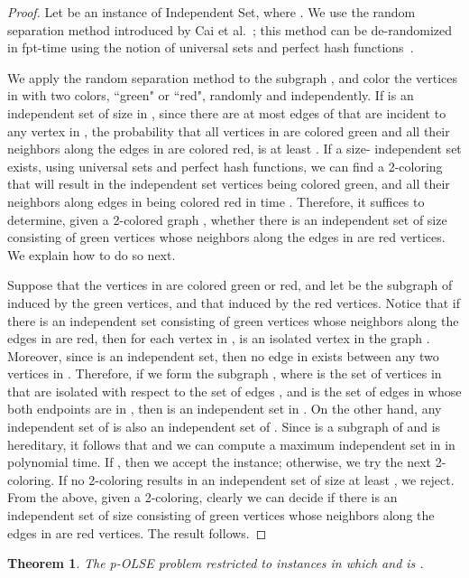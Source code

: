 \documentclass[11pt]{article}
\newtheorem{theorem}{Theorem}[section]
\begin{document}
\begin{proof}
Let  be an instance of {\sc Independent Set}, where .
We use the random separation method introduced by Cai et al.~\cite{cai}; this method can be de-randomized in fpt-time using the notion of universal sets and perfect hash functions~\cite{alon95,naor,schmidt}.

We apply the random separation method to the subgraph , and color the vertices in  with two colors, ``green" or ``red", randomly and independently. If  is an independent set of size  in , since there are at most  edges of  that are incident to any vertex in , the probability that all vertices in  are colored green and all their neighbors along the edges in  are colored red, is at least . If a size- independent set exists, using universal sets and perfect hash functions, we can find a 2-coloring that will result in the independent set vertices being colored green, and all their neighbors along edges in  being colored red in time . Therefore, it suffices to determine, given a 2-colored graph , whether there is an independent set of size  consisting of green vertices whose neighbors along the edges in  are red vertices. We explain how to do so next.


Suppose that the vertices in  are colored green or red, and let  be the subgraph of  induced by the green vertices, and  that induced by the red vertices. Notice that if there is an independent set  consisting of  green vertices whose neighbors along the edges in  are red, then for each vertex  in ,  is an isolated vertex in the graph . Moreover, since  is an independent set, then no edge in  exists between any two vertices in . Therefore, if we form the subgraph , where  is the set of vertices in  that are isolated with respect to the set of edges , and  is the set of edges in  whose both endpoints are in , then  is an independent set in . On the other hand, any independent set of  is also an independent set of .  Since  is a subgraph of  and  is hereditary, it follows that  and we can compute a maximum independent set  in  in polynomial time. If , then we accept the instance; otherwise, we try the next 2-coloring. If no 2-coloring results in an independent set of size at least , we reject. From the above, given a 2-coloring, clearly we can decide if there is an independent set of size  consisting of green vertices whose neighbors along the edges in  are red vertices. The result follows.\end{proof}


\begin{theorem}
\label{thm:mainboundeddegree}
The p-OLSE problem restricted to instances in which  and  is .
\end{theorem}
\end{document}

